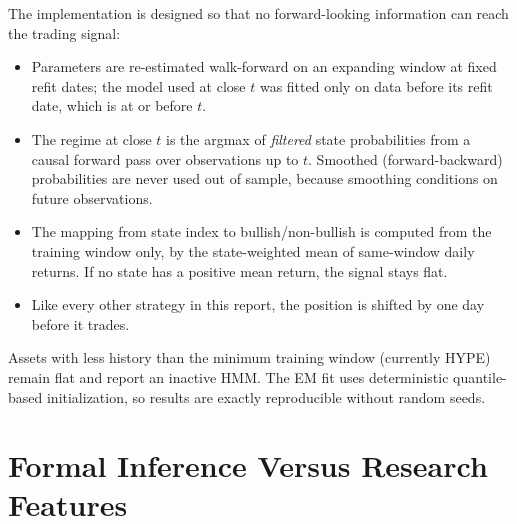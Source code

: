 \documentclass[11pt]{article}
\begin{document}
The implementation is designed so that no forward-looking information can reach the trading signal:
\begin{itemize}
    \item Parameters are re-estimated walk-forward on an expanding window at fixed refit dates; the model used at close $t$ was fitted only on data before its refit date, which is at or before $t$.
    \item The regime at close $t$ is the argmax of \emph{filtered} state probabilities from a causal forward pass over observations up to $t$. Smoothed (forward-backward) probabilities are never used out of sample, because smoothing conditions on future observations.
    \item The mapping from state index to bullish/non-bullish is computed from the training window only, by the state-weighted mean of same-window daily returns. If no state has a positive mean return, the signal stays flat.
    \item Like every other strategy in this report, the position is shifted by one day before it trades.
\end{itemize}
Assets with less history than the minimum training window (currently HYPE) remain flat and report an inactive HMM. The EM fit uses deterministic quantile-based initialization, so results are exactly reproducible without random seeds.

\section{Formal Inference Versus Research Features}

\begin{table}[H]
\centering
\scriptsize
\setlength{\tabcolsep}{4pt}
\caption{Interpretation labels for the report's diagnostics and strategy conversions.}
\end{table}
\end{document}
